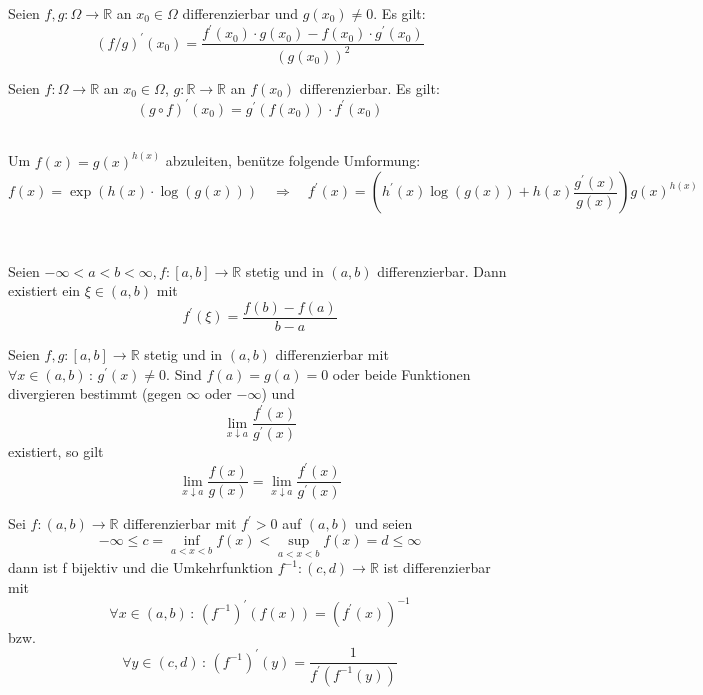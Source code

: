	\begin{theorem}[Quotientenregel]
		Seien $f,g: \Omega \to \mathbb{R}$ an $x_0 \in \Omega$ differenzierbar und $g(x_0) \neq 0$. Es gilt:
		$$ (f / g)^\prime(x_0) = \frac{f^\prime(x_0) \cdot g(x_0) - f(x_0) \cdot g^\prime(x_0)}{(g(x_0))^2} $$
	\end{theorem}
	\begin{theorem}[Kettenregel]
		Seien $f: \Omega \to \mathbb{R}$ an $x_0 \in \Omega$, $g: \mathbb{R} \to \mathbb{R}$ an $f(x_0)$ differenzierbar. Es gilt:
		$$ (g \circ f)^\prime(x_0) = g^\prime(f(x_0)) \cdot f^\prime(x_0) $$
	\end{theorem}
	\begin{hint}
		\hfill\\
		Um $f(x) = g(x)^{h(x)}$ abzuleiten, benütze folgende Umformung:
		$$ f(x) = \exp \left( h(x) \cdot \log (g(x)) \right) \quad\Rightarrow\quad f^\prime(x) =  \left( h^\prime(x) \log (g(x)) + h(x) \frac{g^\prime(x)}{g(x)}\right)g(x)^{h(x)}$$
	\end{hint}
	\\[1em]
		\begin{theorem}[Mittelwertsatz]
			Seien $ -\infty < a < b < \infty, f: [a,b] \to \mathbb{R}$ stetig und in $(a,b)$ differenzierbar. Dann existiert ein $\xi \in (a,b)$ mit
			$$ f^\prime(\xi) = \frac{f(b) - f(a)}{b - a} $$
		\end{theorem}
		\begin{corollary}
			Seien $f,g: [a,b] \to \mathbb{R}$ stetig und in $(a,b)$ differenzierbar mit $\forall x \in (a,b) \, : \, g^\prime(x) \neq 0$. Sind $f(a) = g(a) = 0$ oder beide Funktionen divergieren bestimmt (gegen $\infty$ oder $-\infty$) und
			$$ \lim\limits_{x \downarrow a} \frac{f^\prime(x)}{g^\prime(x)} $$
			existiert, so gilt
			$$ \lim\limits_{x \downarrow a} \frac{f(x)}{g(x)} = \lim\limits_{x \downarrow a} \frac{f^\prime(x)}{g^\prime(x)} $$
		\end{corollary}
		\begin{theorem}[Umkehrsatz]
			Sei $f: (a,b) \to \mathbb{R}$ differenzierbar mit $f^\prime > 0$ auf $(a,b)$ und seien
			$$ -\infty \leq c = \inf\limits_{a<x<b} f(x) < \sup\limits_{a<x<b} f(x) = d \leq \infty $$
			dann ist f bijektiv und die Umkehrfunktion $f^{-1}: (c,d) \to \mathbb{R}$ ist differenzierbar mit
			$$ \forall x \in (a,b) \, : \, \left(f^{-1}\right)^\prime(f(x)) = \left(f^\prime(x)\right)^{-1} $$
			bzw.
			$$ \forall y \in (c,d) \, : \, \left(f^{-1}\right)^\prime(y) =  \frac{1}{f^\prime(f^{-1}(y))}$$
		\end{theorem}
